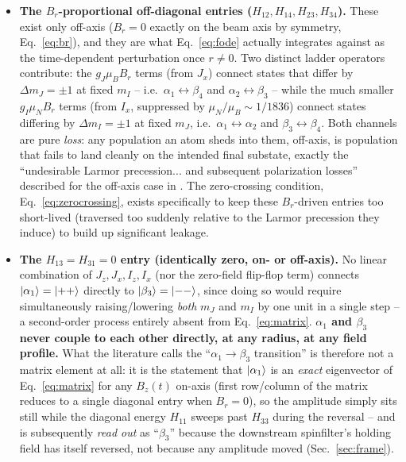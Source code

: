 \documentclass[11pt,a4paper]{article}
\begin{document}
\begin{itemize}
    \item \textbf{The $B_r$-proportional off-diagonal entries
    ($H_{12},H_{14},H_{23},H_{34}$).} These exist only off-axis
    ($B_r=0$ exactly on the beam axis by symmetry, Eq.~\eqref{eq:br}), and
    they are what Eq.~\eqref{eq:fode} actually integrates against as the
    time-dependent perturbation once $r\neq0$. Two distinct ladder
    operators contribute: the $g_J\mu_B B_r$ terms (from $J_x$) connect
    states that differ by $\Delta m_J=\pm1$ at fixed $m_I$ -- i.e.\
    $\alpha_1\!\leftrightarrow\!\beta_4$ and $\alpha_2\!\leftrightarrow\!\beta_3$
    -- while the much smaller $g_I\mu_N B_r$ terms (from $I_x$, suppressed
    by $\mu_N/\mu_B\sim1/1836$) connect states differing by
    $\Delta m_I=\pm1$ at fixed $m_J$, i.e.\
    $\alpha_1\!\leftrightarrow\!\alpha_2$ and $\beta_3\!\leftrightarrow\!\beta_4$.
    Both channels are pure \emph{loss}: any population an atom sheds into
    them, off-axis, is population that fails to land cleanly on the
    intended final substate, exactly the ``undesirable Larmor precession...
    and subsequent polarization losses'' described for the off-axis case in
    \cite{kannis2022spin}. The zero-crossing condition,
    Eq.~\eqref{eq:zerocrossing}, exists specifically to keep these
    $B_r$-driven entries too short-lived (traversed too suddenly relative to
    the Larmor precession they induce) to build up significant leakage.

    \item \textbf{The $H_{13}=H_{31}=0$ entry (identically zero, on- or
    off-axis).} No linear combination of $J_z,J_x,I_z,I_x$ (nor the
    zero-field flip-flop term) connects $\ket{\alpha_1}=\ket{{+}{+}}$
    directly to $\ket{\beta_3}=\ket{{-}{-}}$, since doing so would require
    simultaneously raising/lowering \emph{both} $m_J$ and $m_I$ by one unit
    in a single step -- a second-order process entirely absent from
    Eq.~\eqref{eq:matrix}. \textbf{$\alpha_1$ and $\beta_3$ never couple to
    each other directly, at any radius, at any field profile.} What the
    literature calls the ``$\alpha_1\to\beta_3$ transition'' is therefore
    not a matrix element at all: it is the statement that $\ket{\alpha_1}$
    is an \emph{exact} eigenvector of Eq.~\eqref{eq:matrix} for any $B_z(t)$
    on-axis (first row/column of the matrix reduces to a single diagonal
    entry when $B_r=0$), so the amplitude simply sits still while the
    diagonal energy $H_{11}$ sweeps past $H_{33}$ during the reversal --
    and is subsequently \emph{read out} as ``$\beta_3$'' because the
    downstream spinfilter's holding field has itself reversed, not because
    any amplitude moved (Sec.~\ref{sec:frame}).
\end{itemize}
\end{document}
